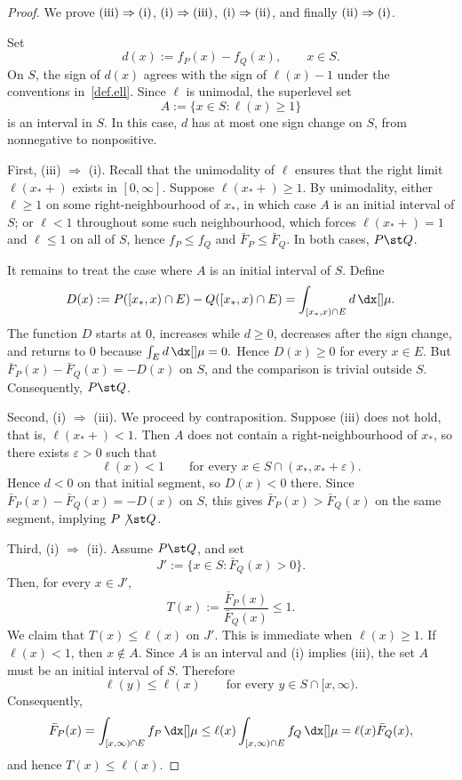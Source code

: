 \documentclass[11pt]{article}
\begin{document}
\begin{proof}
We prove \(\textup{(iii)}\Rightarrow\textup{(i)}\), \(\textup{(i)}\Rightarrow\textup{(iii)}\), \(\textup{(i)}\Rightarrow\textup{(ii)}\), and finally \(\textup{(ii)}\Rightarrow\textup{(i)}\). %

Set
\[
d(x):=f_P(x)-f_Q(x),\qquad x\in S.
\]
On $S$, the sign of $d(x)$ agrees with the sign of $\ell(x)-1$ under the conventions in~\eqref{def.ell}. Since $\ell$ is unimodal, the superlevel set
\[
A:=\{x\in S:\ell(x)\ge 1\}
\]
is an interval in $S$. In this case, \(d\) has at most one sign change on \(S\), from nonnegative to nonpositive. 

First, \textup{(iii)} $\Longrightarrow$ \textup{(i)}. Recall that the unimodality of \(\ell\) ensures that the right limit \(\ell(x_*+)\) exists in \([0,\infty]\). Suppose \(\ell(x_*+)\ge 1\). By unimodality, either \(\ell\ge 1\) on some right-neighbourhood of \(x_*\), in which case \(A\) is an initial interval of \(S\); or \(\ell<1\) throughout some such neighbourhood, which forces \(\ell(x_*+)=1\) and \(\ell\le 1\) on all of \(S\), hence \(f_P\le f_Q\) and \(\bar F_P\le \bar F_Q\). In both cases, \(P\st Q\).

It remains to treat the case where \(A\) is an initial interval of \(S\). 
Define
\[
D(x):=P([x_*,x)\cap E)-Q([x_*,x)\cap E) =\int_{[x_*,x)\cap E} d\,\dx[]\mu.
\]
The function $D$ starts at $0$, increases while $d\ge 0$, decreases after the sign change, and returns to $0$ because $\int_E d\,\dx[]\mu=0.$ Hence $D(x)\ge 0$ for every $x\in E$. But $\bar F_P(x)-\bar F_Q(x)=-D(x)$ on $S$, and the comparison is trivial outside $S$. Consequently, $P\st Q$.

Second, \textup{(i)} $\Longrightarrow$ \textup{(iii)}. We proceed by contraposition. Suppose \textup{(iii)} does not hold, that is, \(\ell(x_*+)<1\). Then $A$ does not contain a right-neighbourhood of $x_*$, so there exists $\varepsilon>0$ such that
\[
\ell(x)<1
\qquad\text{for every }x\in S\cap(x_*,x_*+\varepsilon).
\]
Hence $d<0$ on that initial segment, so $D(x)<0$ there. Since $\bar F_P(x)-\bar F_Q(x)=-D(x)$ on $S$, this gives $\bar F_P(x)>\bar F_Q(x)$ on the same segment, implying $P\not\st Q$.

Third, \textup{(i)} $\Longrightarrow$ \textup{(ii)}.
Assume $P\st Q$, and set
\[
J':=\{x\in S:\bar F_Q(x)>0\}.
\]
Then, for every $x\in J'$, $$T(x):=\dfrac{\bar F_P(x)}{\bar F_Q(x)}\le 1.$$ We claim that $T(x)\le \ell(x)$ on $J'$. This is immediate when \(\ell(x)\ge 1\). If \(\ell(x)<1\), then \(x\notin A\). Since \(A\) is an interval and \textup{(i)} implies \textup{(iii)}, the set \(A\) must be an initial interval of \(S\). Therefore
\[
\ell(y)\le \ell(x)\qquad\text{for every }y\in S\cap[x,\infty).
\]
Consequently,
\[
\bar F_P(x) =\int_{[x,\infty)\cap E} f_P\,\dx[]\mu \le \ell(x)\int_{[x,\infty)\cap E} f_Q\,\dx[]\mu =\ell(x)\bar F_Q(x),
\]
and hence $T(x)\le \ell(x)$.


\end{proof}
\end{document}
